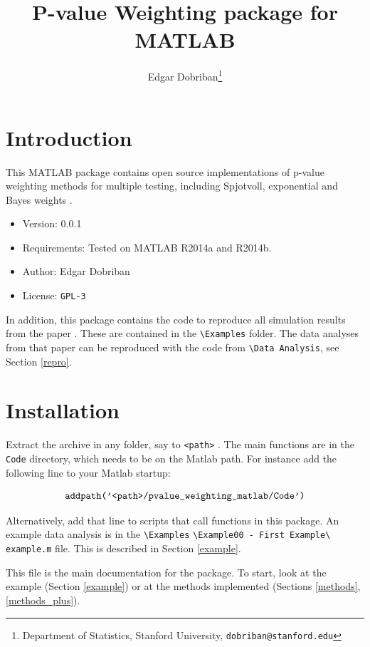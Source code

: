 \documentclass[english,11pt]{article} %
\title{P-value Weighting package for MATLAB}
\author{Edgar Dobriban\thanks{Department of Statistics, Stanford University, \texttt{dobriban@stanford.edu}} }
\begin{document}
\maketitle
\tableofcontents
\section{Introduction}

This MATLAB package contains open source implementations of p-value weighting methods for multiple testing, including Spjotvoll, exponential and Bayes weights \citep[proposed in][]{dobriban2015optimal}. %

\begin{itemize}
\item{Version: } 0.0.1
\item{Requirements: } Tested on MATLAB R2014a and R2014b. 
\item{Author: } Edgar Dobriban
\item{License: } \verb+GPL-3+
\end{itemize}

In addition, this package contains the code to reproduce all simulation results from the paper \cite{dobriban2015optimal}. These are contained in the \verb+\Examples+ folder. The data analyses from that paper can be reproduced with the code from \verb+\Data Analysis+, see Section \ref{repro}. 

\section{Installation}

Extract the archive in any folder, say to \verb+<path>+ . The main functions are in the \verb+Code+ directory, which needs to be on the Matlab path. For instance add the following line to your Matlab startup:

$$\verb+addpath('<path>/pvalue_weighting_matlab/Code')+$$

Alternatively,  add that line to scripts that call functions in this package. An example data analysis is in the \verb+\Examples+ \verb+\Example00 - First Example\+ \verb+example.m+ file. This is described in Section \ref{example}.

This file is the main documentation for the package. To start, look at the example (Section \ref{example}) or at the methods implemented (Sections \ref{methods}, \ref{methods_plus}).
\end{document}
